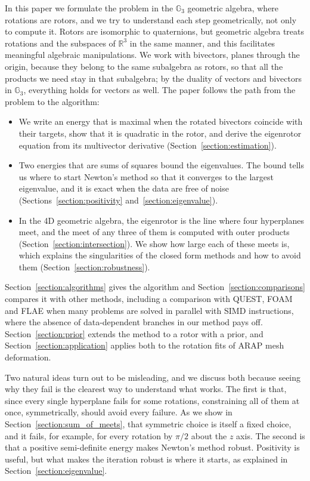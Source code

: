 \documentclass{birkjour}
\theoremstyle{definition}
\theoremstyle{remark}
\numberwithin{equation}{section}
\newcommand{\Ge}{\mathbb{G}}
\newcommand{\R}{\mathbb{R}}
\begin{document}
In this paper we formulate the problem in the $\Ge_3$ geometric algebra, where rotations are rotors, and we try to understand each step geometrically, not only to compute it. Rotors are isomorphic to quaternions, but geometric algebra treats rotations and the subspaces of $\R^3$ in the same manner, and this facilitates meaningful algebraic manipulations. We work with bivectors, planes through the origin, because they belong to the same subalgebra as rotors, so that all the products we need stay in that subalgebra; by the duality of vectors and bivectors in $\Ge_3$, everything holds for vectors as well. The paper follows the path from the problem to the algorithm:
\begin{itemize}
\item We write an energy that is maximal when the rotated bivectors coincide with their targets, show that it is quadratic in the rotor, and derive the eigenrotor equation from its multivector derivative (Section~\ref{section:estimation}).
\item Two energies that are sums of squares bound the eigenvalues. The bound tells us where to start Newton's method so that it converges to the largest eigenvalue, and it is exact when the data are free of noise (Sections~\ref{section:positivity} and~\ref{section:eigenvalue}).
\item In the 4D geometric algebra, the eigenrotor is the line where four hyperplanes meet, and the meet of any three of them is computed with outer products (Section~\ref{section:intersection}). We show how large each of these meets is, which explains the singularities of the closed form methods and how to avoid them (Section~\ref{section:robustness}).
\end{itemize}
Section~\ref{section:algorithms} gives the algorithm and Section~\ref{section:comparisons} compares it with other methods, including a comparison with QUEST, FOAM and FLAE when many problems are solved in parallel with SIMD instructions, where the absence of data-dependent branches in our method pays off. Section~\ref{section:prior} extends the method to a rotor with a prior, and Section~\ref{section:application} applies both to the rotation fits of ARAP mesh deformation.

Two natural ideas turn out to be misleading, and we discuss both because seeing why they fail is the clearest way to understand what works. The first is that, since every single hyperplane fails for some rotations, constraining all of them at once, symmetrically, should avoid every failure. As we show in Section~\ref{section:sum_of_meets}, that symmetric choice is itself a fixed choice, and it fails, for example, for every rotation by $\pi/2$ about the $z$ axis. The second is that a positive semi-definite energy makes Newton's method robust. Positivity is useful, but what makes the iteration robust is where it starts, as explained in Section~\ref{section:eigenvalue}.
\end{document}
